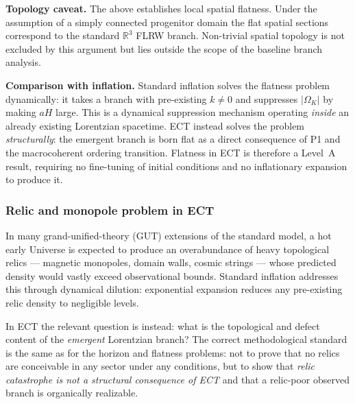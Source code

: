 \documentclass[11pt,a4paper]{article}
\numberwithin{equation}{section}
\begin{document}
\textbf{Topology caveat.}
The above establishes local spatial flatness.
Under the assumption of a simply connected progenitor domain the flat
spatial sections correspond to the standard $\mathbb{R}^3$ FLRW branch.
Non-trivial spatial topology is not excluded by this argument but lies
outside the scope of the baseline branch analysis.

\textbf{Comparison with inflation.}
Standard inflation solves the flatness problem dynamically: it takes a
branch with pre-existing $k\neq 0$ and suppresses $|\Omega_K|$ by making
$aH$ large.
This is a dynamical suppression mechanism operating \emph{inside} an
already existing Lorentzian spacetime.
ECT instead solves the problem \emph{structurally}: the emergent branch is
born flat as a direct consequence of P1 and the macrocoherent ordering
transition.
Flatness in ECT is therefore a Level~A result, requiring no
fine-tuning of initial conditions and no inflationary expansion
to produce it.


\subsubsection*{Relic and monopole problem in ECT}
\label{sec:relic_ect}

In many grand-unified-theory (GUT) extensions of the standard model, a hot
early Universe is expected to produce an overabundance of heavy topological
relics --- magnetic monopoles, domain walls, cosmic strings --- whose
predicted density would vastly exceed observational bounds.
Standard inflation addresses this through dynamical dilution: exponential
expansion reduces any pre-existing relic density to negligible levels.

In ECT the relevant question is instead: what is the topological and
defect content of the \emph{emergent} Lorentzian branch?
The correct methodological standard is the same as for the horizon and
flatness problems: not to prove that no relics are conceivable in any
sector under any conditions, but to show that \emph{relic catastrophe
is not a structural consequence of ECT} and that a relic-poor observed
branch is organically realizable.
\end{document}
